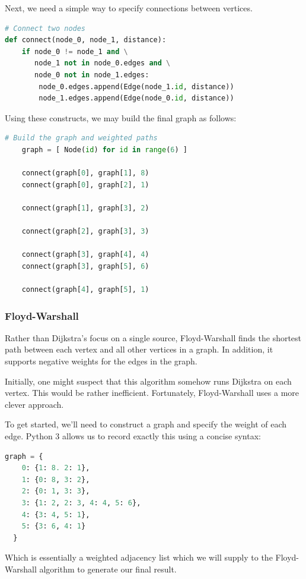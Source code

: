 \documentclass{article}
\begin{document}
Next, we need a simple way to specify connections between vertices.

\begin{lstlisting}[language=Python]
# Connect two nodes
def connect(node_0, node_1, distance):
    if node_0 != node_1 and \
       node_1 not in node_0.edges and \
       node_0 not in node_1.edges:
        node_0.edges.append(Edge(node_1.id, distance))
        node_1.edges.append(Edge(node_0.id, distance))
\end{lstlisting}

Using these constructs, we may build the final graph as follows:

\begin{lstlisting}[language=Python]
  # Build the graph and weighted paths
    graph = [ Node(id) for id in range(6) ]
    
    connect(graph[0], graph[1], 8)
    connect(graph[0], graph[2], 1)

    connect(graph[1], graph[3], 2)

    connect(graph[2], graph[3], 3)

    connect(graph[3], graph[4], 4)
    connect(graph[3], graph[5], 6)

    connect(graph[4], graph[5], 1)
\end{lstlisting}

\subsubsection{Floyd-Warshall}
Rather than Dijkstra's focus on a single source, Floyd-Warshall finds the shortest path between each vertex and all other vertices in a graph. In addition, it supports negative weights for the edges in the graph.

Initially, one might suspect that this algorithm somehow runs Dijkstra on each vertex.
This would be rather inefficient. Fortunately, Floyd-Warshall uses a more clever approach.

To get started, we'll need to construct a graph and specify the weight of each edge.
Python 3 allows us to record exactly this using a concise syntax:

\begin{lstlisting}[language=Python]
  graph = {
    0: {1: 8. 2: 1},
    1: {0: 8, 3: 2},
    2: {0: 1, 3: 3},
    3: {1: 2, 2: 3, 4: 4, 5: 6},
    4: {3: 4, 5: 1},
    5: {3: 6, 4: 1}
  }
\end{lstlisting}

Which is essentially a weighted adjacency list which we will supply to the Floyd-Warshall algorithm to generate our final result.
\end{document}
